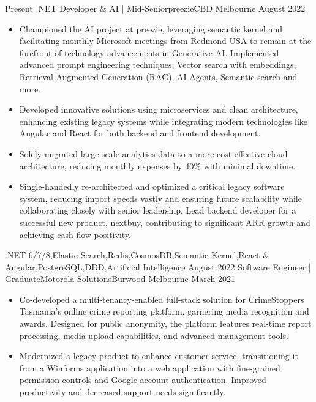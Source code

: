 
\begin{experiences}
  \experience
    {Present}   {.NET Developer \& AI | Mid-Senior}{preezie}{CBD Melbourne}
    {August 2022} {
                      \begin{itemize}
					    \item Championed the AI project at preezie, leveraging semantic kernel and facilitating monthly Microsoft meetings from Redmond USA to remain at the forefront of technology advancements in Generative AI. Implemented advanced prompt engineering techniques, Vector search with embeddings, Retrieval Augmented Generation (RAG), AI Agents, Semantic search and more.
                        \item Developed innovative solutions using microservices and clean architecture, enhancing existing legacy systems while integrating modern technologies like Angular and React for both backend and frontend development.       
                        \item Solely migrated large scale analytics data to a more cost effective cloud architecture, reducing monthly expenses by 40\% with minimal downtime.
                        \item Single-handedly re-architected and optimized a critical legacy software system, reducing import speeds vastly and ensuring future scalability while collaborating closely with senior leadership. Lead backend developer for a successful new product, nextbuy, contributing to significant ARR growth and achieving cash flow positivity.                                                                   
                      \end{itemize}
                    }
                    {.NET 6/7/8,Elastic Search,Redis,CosmosDB,Semantic Kernel,React \& Angular,PostgreSQL,DDD,Artificial Intelligence}
  \emptySeparator
  \experience
    {August 2022} {Software Engineer | Graduate}{Motorola Solutions}{Burwood Melbourne}
    {March 2021}    {
                      \begin{itemize}
                        \item Co-developed a multi-tenancy-enabled full-stack solution for CrimeStoppers Tasmania's online crime reporting platform, garnering media recognition and awards. Designed for public anonymity, the platform features real-time report processing, media upload capabilities, and advanced management tools.
                        \item Modernized a legacy product to enhance customer service, transitioning it from a Winforms application into a web application with fine-grained permission controls and Google account authentication. Improved productivity and decreased support needs significantly.

\end{itemize}}
\end{experiences}
